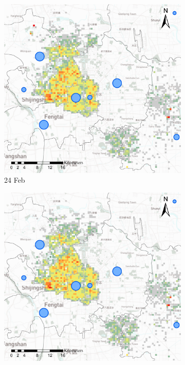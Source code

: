 \documentclass[preprints,article,accept,moreauthors,pdftex]{Definitions/mdpi}
\begin{document}
\begin{figure}[ht]
    \vspace{6pt}
    \begin{subfigure}{.3\textwidth}
        \includegraphics[width=\textwidth]{Figures/Relation_with_confrimed_cases/NewDistrictSSBD2020_02_24.eps}
        \caption{24 Feb}\label{fig:correlation_02_24}
    \end{subfigure}
    \begin{subfigure}{.3\textwidth}
        \includegraphics[width=\textwidth]{Figures/Relation_with_confrimed_cases/NewDistrictSSBD2020_02_28.eps}

\end{subfigure}
\end{figure}
\end{document}
